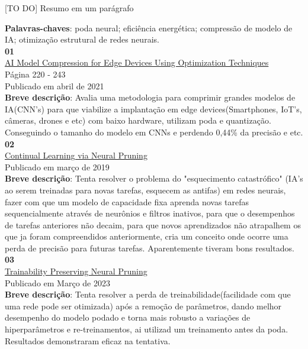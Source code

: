 \begin{resumo}

[TO DO] Resumo em um parágrafo
     
 \vspace{\onelineskip}
 \noindent
 \textbf{Palavras-chaves}: poda neural; eficiência energética; compressão de modelo de IA; otimização estrutural de redes neurais.
\\
\textbf{01}
\\
\href{https://sci-hub.st/https://link.springer.com/chapter/10.1007/978-3-030-68291-0_17}{AI Model Compression for Edge Devices Using Optimization Techniques}
\\
Página 220 - 243
\\
Publicado em abril de 2021
\\
\textbf{Breve descrição}:
Avalia uma metodologia para comprimir grandes modelos de IA(CNN's) para que viabilize a implantação em edge devices(Smartphones, IoT's, câmeras, drones e etc) com baixo hardware, utilizam poda e quantização. Conseguindo o tamanho do modelo em CNNs e perdendo 0,44\% da precisão e etc.
\\
\textbf{02}
\\
\href{https://arxiv.org/pdf/1903.04476}{Continual Learning via Neural Pruning}
\\
Publicado em março de 2019
\\
\textbf{Breve descrição}:
Tenta resolver o problema do "esquecimento catastrófico" (IA's ao serem treinadas para novas tarefas, esquecem as antifas) em redes neurais, fazer com que um modelo de capacidade fixa aprenda novas tarefas sequencialmente através de neurônios e filtros inativos, para que o desempenhos de tarefas anteriores não decaim, para que novos aprendizados não atrapalhem os que ja foram compreendidos anteriormente, cria um conceito onde ocorre uma perda de precisão para futuras tarefas. Aparentemente tiveram bons resultados.
\\
\textbf{03}
\\
\href{https://arxiv.org/pdf/2207.12534}{Trainability Preserving Neural Pruning}
\\
Publicado em Março de 2023
\\
\textbf{Breve descrição}:
Tenta resolver a perda de treinabilidade(facilidade com que uma rede pode ser otimizada) após a remoção de parâmetros, dando melhor desempenho do modelo podado e torna mais robusto a variações de hiperparâmetros e re-treinamentos, ai utilizad um treinamento antes da poda. Resultados demonstraram eficaz na tentativa.
\\

\end{resumo}
